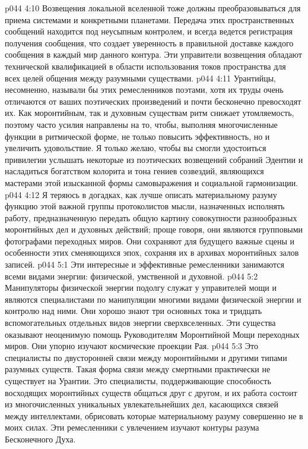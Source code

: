 \vs p044 4:10 Возвещения локальной вселенной тоже должны преобразовываться для приема системами и конкретными планетами. Передача этих пространственных сообщений находится под неусыпным контролем, и всегда ведется регистрация получения сообщения, что создает уверенность в правильной доставке каждого сообщения в каждый мир данного контура. Эти управители возвещения обладают технической квалификацией в области использования токов пространства для всех целей общения между разумными существами.
\vs p044 4:11 \pc {}\bibnobreakspace {} Урантийцы, несомненно, называли бы этих ремесленников поэтами, хотя их труды очень отличаются от ваших поэтических произведений и почти бесконечно превосходят их. Как моронтийным, так и духовным существам ритм снижает утомляемость, поэтому часто усилия направлены на то, чтобы, выполняя многочисленные функции в ритмической форме, не только повысить эффективность, но и увеличить удовольствие. Я только желаю, чтобы вы смогли удостоиться привилегии услышать некоторые из поэтических возвещений собраний Эдентии и насладиться богатством колорита и тона гениев созвездий, являющихся мастерами этой изысканной формы самовыражения и социальной гармонизации.
\vs p044 4:12 \pc {}\bibnobreakspace {} Я теряюсь в догадках, как лучше описать материальному разуму функцию этой важной группы протоколистов мысли, назначенных исполнять работу, предназначенную передать общую картину совокупности разнообразных моронтийных дел и духовных действий; проще говоря, они являются групповыми фотографами переходных миров. Они сохраняют для будущего важные сцены и особенности этих сменяющихся эпох, сохраняя их в архивах моронтийных залов записей.
\vs p044 5:1 Эти интересные и эффективные ремесленники занимаются всеми видами энергии: физической, умственной и духовной.
\vs p044 5:2 \pc {}\bibnobreakspace {} Манипуляторы физической энергии подолгу служат у управителей мощи и являются специалистами по манипуляции многими видами физической энергии и контролю над ними. Они хорошо знают три основных тока и тридцать вспомогательных отдельных видов энергии сверхвселенных. Эти существа оказывают неоценимую помощь Руководителям Моронтийной Мощи переходных миров. Они упорно изучают космические проекции Рая.
\vs p044 5:3 \pc {}\bibnobreakspace {} Это специалисты по двусторонней связи между моронтийными и другими типами разумных существ. Такая форма связи между смертными практически не существует на Урантии. Это специалисты, поддерживающие способность восходящих моронтийных существ общаться друг с другом, и их работа состоит из многочисленных уникальных увлекательнейших дел, касающихся связей между интеллектами, обрисовать которые материальному разуму совершенно не в моих силах. Эти ремесленники с увлечением изучают контуры разума Бесконечного Духа.
